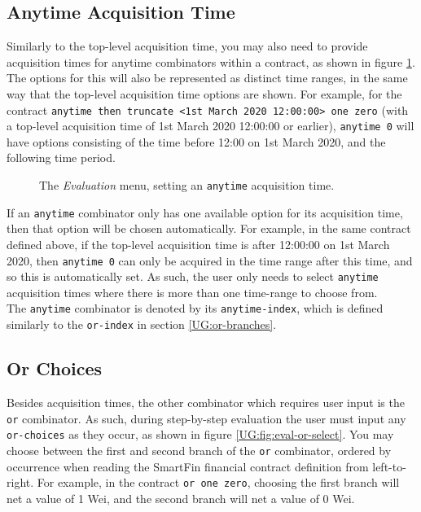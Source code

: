 \subsection{Anytime Acquisition Time}

Similarly to the top-level acquisition time, you may also need to provide acquisition times for anytime combinators within a contract, as shown in figure \ref{UG:fig:eval-anytime-select}. The options for this will also be represented as distinct time ranges, in the same way that the top-level acquisition time options are shown. For example, for the contract \texttt{anytime then truncate <1st March 2020 12:00:00> one zero} (with a top-level acquisition time of 1st March 2020 12:00:00 or earlier), \texttt{anytime 0} will have options consisting of the time before 12:00 on 1st March 2020, and the following time period.

\begin{figure}[h]
    \centering
    \caption{The \textit{Evaluation} menu, setting an \texttt{anytime} acquisition time.}
    \label{UG:fig:eval-anytime-select}
\end{figure}

If an \texttt{anytime} combinator only has one available option for its acquisition time, then that option will be chosen automatically. For example, in the same contract defined above, if the top-level acquisition time is after 12:00:00 on 1st March 2020, then \texttt{anytime 0} can only be acquired in the time range after this time, and so this is automatically set. As such, the user only needs to select \texttt{anytime} acquisition times where there is more than one time-range to choose from. \\

The \texttt{anytime} combinator is denoted by its \texttt{anytime-index}, which is defined similarly to the \texttt{or-index} in section \ref{UG:or-branches}.


\subsection{Or Choices}

Besides acquisition times, the other combinator which requires user input is the \texttt{or} combinator. As such, during step-by-step evaluation the user must input any \texttt{or-choices} as they occur, as shown in figure \ref{UG:fig:eval-or-select}. You may choose between the first and second branch of the \texttt{or} combinator, ordered by occurrence when reading the SmartFin financial contract definition from left-to-right. For example, in the contract \texttt{or one zero}, choosing the first branch will net a value of 1 Wei, and the second branch will net a value of 0 Wei.

